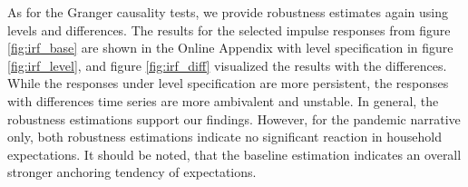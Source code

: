 As for the Granger causality tests, we provide robustness estimates again using levels and differences. The results for the selected impulse responses from figure \ref{fig:irf_base} are shown in the Online Appendix with level specification in figure \ref{fig:irf_level}, and figure \ref{fig:irf_diff} visualized the results with the differences. While the responses under level specification are more persistent, the responses with differences time series are more ambivalent and unstable. In general, the robustness estimations support our findings. However, for the pandemic narrative only, both robustness estimations indicate no significant reaction in household expectations. It should be noted, that the baseline estimation indicates an overall stronger anchoring tendency of expectations.
